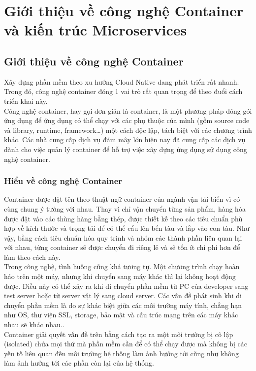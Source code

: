 \documentclass[12pt,a4paper]{report}
\begin{document}
	\chapter{Giới thiệu về công nghệ Container và kiến trúc Microservices}
		\section{Giới thiệu về công nghệ Container}
		\smallskip
		\hspace{0.6cm}Xây dựng phần mềm theo xu hướng Cloud Native đang phát triển rất nhanh. Trong đó, công nghệ container đóng 1 vai trò rất quan trọng để theo đuổi cách triển khai này.\\
			
		Công nghệ container, hay gọi đơn giản là container, là một phương pháp đóng gói ứng dụng để ứng dụng có thể chạy với các phụ thuộc của mình (gồm source code và library, runtime, framework…) một cách độc lập, tách biệt với các chương trình khác. Các nhà cung cấp dịch vụ đám mây lớn hiện nay đã cung cấp các dịch vụ dành cho việc quản lý container để hỗ trợ việc xây dựng ứng dụng sử dụng công nghệ container.
		\subsection{Hiểu về công nghệ Container}
		\hspace{0.6cm}Container được đặt tên theo thuật ngữ container của ngành vận tải biển vì có cùng chung ý tưởng với nhau. Thay vì chỉ vận chuyển từng sản phẩm, hàng hóa được đặt vào các thùng hàng bằng thép, được thiết kế theo các tiêu chuẩn phù hợp về kích thước và trọng tải để có thể cẩu lên bến tàu và lắp vào con tàu. Như vậy, bằng cách tiêu chuẩn hóa quy trình và nhóm các thành phần liên quan lại với nhau, từng container sẽ được chuyển đi riêng lẻ và sẽ tốn ít chi phí hơn để làm theo cách này.\\
		
		Trong công nghệ, tình huống cũng khá tương tự. Một chương trình chạy hoàn hảo trên một máy, nhưng khi chuyển sang máy khác thì lại không hoạt động được. Điều này có thể xảy ra khi di chuyển phần mềm từ PC của developer sang test server hoặc từ server vật lý sang cloud server. Các vấn đề phát sinh khi di chuyển phần mềm là do sự khác biệt giữa các môi trường máy tính, chẳng hạn như OS, thư viện SSL, storage, bảo mật và cấu trúc mạng trên các máy khác nhau sẽ khác nhau..\\
		
		Container giải quyết vấn đề trên bằng cách tạo ra một môi trường bị cô lập (isolated) chứa mọi thứ mà phần mềm cần để có thể chạy được mà không bị các yếu tố liên quan đến môi trường hệ thống làm ảnh hưởng tới cũng như không làm ảnh hưởng tới các phần còn lại của hệ thống.\\
		
\end{document}
